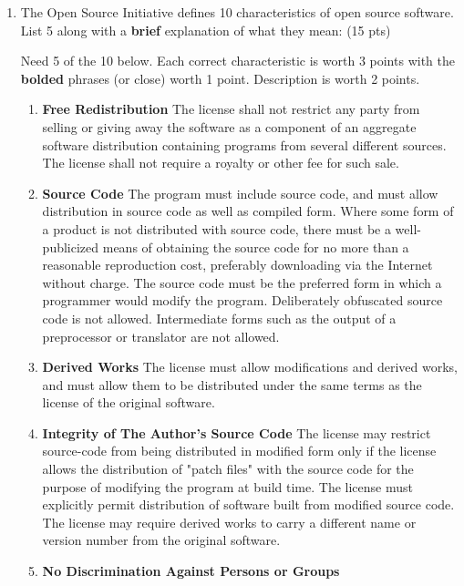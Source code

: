 \documentclass[10pt]{article}
\begin{document}
\newpage

\fi

\begin{enumerate}

	\item The Open Source Initiative defines 10 characteristics of open source software. List 5 along with a \textbf{brief} explanation of what they mean: (15 pts)
	
\beginanswers
Need 5 of the 10 below. Each correct characteristic is worth 3 points with the \textbf{bolded} phrases (or close) worth 1 point. Description is worth 2 points.
\begin{enumerate}
\item \textbf{Free Redistribution}
The license shall not restrict any party from selling or giving away the software as a component of an aggregate software distribution containing programs from several different sources. The license shall not require a royalty or other fee for such sale.
\item \textbf{Source Code}
The program must include source code, and must allow distribution in source code as well as compiled form. Where some form of a product is not distributed with source code, there must be a well-publicized means of obtaining the source code for no more than a reasonable reproduction cost, preferably downloading via the Internet without charge. The source code must be the preferred form in which a programmer would modify the program. Deliberately obfuscated source code is not allowed. Intermediate forms such as the output of a preprocessor or translator are not allowed.
\item \textbf{Derived Works}
The license must allow modifications and derived works, and must allow them to be distributed under the same terms as the license of the original software.
\item \textbf{Integrity of The Author's Source Code}
The license may restrict source-code from being distributed in modified form only if the license allows the distribution of "patch files" with the source code for the purpose of modifying the program at build time. The license must explicitly permit distribution of software built from modified source code. The license may require derived works to carry a different name or version number from the original software.
\item \textbf{No Discrimination Against Persons or Groups}

\end{enumerate}
\end{enumerate}
\end{document}
